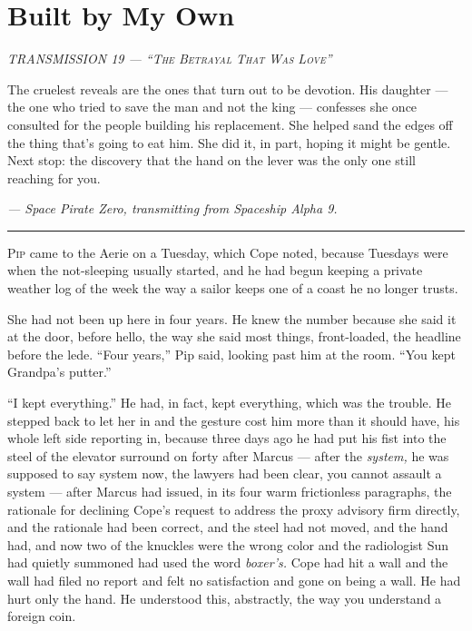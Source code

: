 \documentclass[11pt,openany]{book}
\newcommand{\transheader}{\normalfont\footnotesize\scshape\letterspace}
\newcommand{\letterspace}{}
\newenvironment{transmission}{%
  \par\vspace{0.3\baselineskip}\begin{center}\begin{minipage}{0.88\textwidth}%
  \itshape\small\setlength{\parindent}{0pt}\setstretch{1.06}}%
  {\end{minipage}\end{center}\vspace{0.4\baselineskip}%
  \noindent\hfil\rule{0.35\textwidth}{0.3pt}\hfil\par\vspace{1.0\baselineskip}}
\begin{document}
\clearpage
\chapter{Built by My Own}

\begin{transmission}
{\transheader TRANSMISSION 19 --- ``The Betrayal That Was Love''}\par\vspace{0.5em}
The cruelest reveals are the ones that turn out to be devotion. His daughter --- the one who tried to save the man and not the king --- confesses she once consulted for the people building his replacement. She helped sand the edges off the thing that's going to eat him. She did it, in part, hoping it might be gentle. Next stop: the discovery that the hand on the lever was the only one still reaching for you.\par
\vspace{0.5em}\hfill\textit{--- Space Pirate Zero, transmitting from Spaceship Alpha 9.}\par
\end{transmission}


\lettrine[lines=3, lhang=0.05, nindent=0.25em]{P}{ip} came to the Aerie on a Tuesday, which Cope noted, because Tuesdays were when the not-sleeping usually started, and he had begun keeping a private weather log of the week the way a sailor keeps one of a coast he no longer trusts.

She had not been up here in four years. He knew the number because she said it at the door, before hello, the way she said most things, front-loaded, the headline before the lede. ``Four years,'' Pip said, looking past him at the room. ``You kept Grandpa's putter.''

``I kept everything.'' He had, in fact, kept everything, which was the trouble. He stepped back to let her in and the gesture cost him more than it should have, his whole left side reporting in, because three days ago he had put his fist into the steel of the elevator surround on forty after Marcus --- after the \textit{system,} he was supposed to say system now, the lawyers had been clear, you cannot assault a system --- after Marcus had issued, in its four warm frictionless paragraphs, the rationale for declining Cope's request to address the proxy advisory firm directly, and the rationale had been correct, and the steel had not moved, and the hand had, and now two of the knuckles were the wrong color and the radiologist Sun had quietly summoned had used the word \textit{boxer's.} Cope had hit a wall and the wall had filed no report and felt no satisfaction and gone on being a wall. He had hurt only the hand. He understood this, abstractly, the way you understand a foreign coin.
\end{document}
